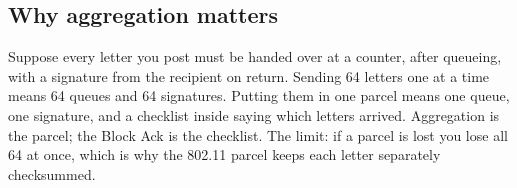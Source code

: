 \subsection{Why aggregation matters}

\begin{analogy}
Suppose every letter you post must be handed over at a counter, after queueing, with a signature
from the recipient on return. Sending 64 letters one at a time means 64 queues and 64 signatures.
Putting them in one parcel means one queue, one signature, and a checklist inside saying which
letters arrived. Aggregation is the parcel; the Block Ack is the checklist. The limit: if a parcel
is lost you lose all 64 at once, which is why the 802.11 parcel keeps each letter separately
checksummed.
\end{analogy}


